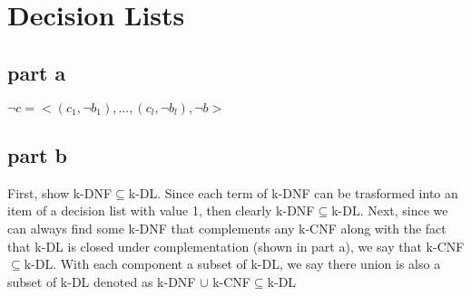 \section{Decision Lists}

\subsection{part a}
$\neg{c} = <(c_1,\neg{b_1}), ..., (c_l, \neg{b_l}), \neg{b}>$

\subsection{part b}
First, show k-DNF$\subseteq$k-DL. Since each term of k-DNF can be trasformed into an item of a decision list with value 1, then clearly k-DNF$\subseteq$k-DL.
Next, since we can always find some k-DNF that complements any k-CNF along with the fact that k-DL is closed under complementation (shown in part a), we say that k-CNF$\subseteq$k-DL.
With each component a subset of k-DL, we say there union is also a subset of k-DL denoted as k-DNF $\cup$ k-CNF$\subseteq$k-DL
